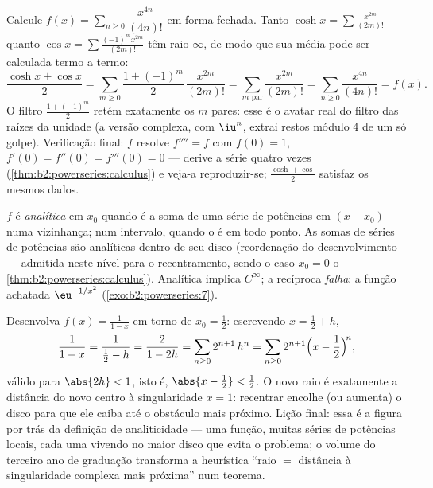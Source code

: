 \begin{example}\label{ex:b2:powerseries:quarter}
Calcule $f(x) = \sum_{n\geq0} \dfrac{x^{4n}}{(4n)!}$ em forma
fechada. Tanto $\cosh x = \sum \frac{x^{2m}}{(2m)!}$ quanto $\cos x =
\sum \frac{(-1)^m x^{2m}}{(2m)!}$ têm raio $\infty$, de modo que sua
média pode ser calculada termo a termo:
\[
\frac{\cosh x + \cos x}{2}
= \sum_{m\geq0}\frac{1 + (-1)^m}{2}\,\frac{x^{2m}}{(2m)!}
= \sum_{m \text{ par}}\frac{x^{2m}}{(2m)!}
= \sum_{n\geq0}\frac{x^{4n}}{(4n)!} = f(x) .
\]
O filtro $\frac{1+(-1)^m}{2}$ retém exatamente os $m$ pares: esse
é o avatar real do filtro das raízes da unidade (a versão
complexa, com $\iu^n$, extrai restos módulo $4$ de um só
golpe). Verificação final: $f$ resolve $f'''' = f$ com $f(0) = 1$,
$f'(0) = f''(0) = f'''(0) = 0$ --- derive a série quatro
vezes (\cref{thm:b2:powerseries:calculus}) e veja-a
reproduzir-se; $\frac{\cosh + \cos}{2}$ satisfaz os mesmos
dados.
\end{example}

\begin{definition}\label{def:b2:powerseries:analytic}
$f$ é \emph{analítica} em $x_0$ quando é
a soma de uma série de potências em $(x - x_0)$ numa vizinhança; num
intervalo, quando o é em todo ponto. As somas de séries de potências são analíticas
dentro de seu disco (reordenação do desenvolvimento --- admitida
neste nível para o recentramento, sendo o caso $x_0 = 0$ o
\cref{thm:b2:powerseries:calculus}). Analítica implica $C^\infty$;
a recíproca \emph{falha}: a função achatada $\eu^{-1/x^2}$
(\cref{exo:b2:powerseries:7}).
\end{definition}

\begin{example}\label{ex:b2:powerseries:recenter}
Desenvolva $f(x) = \frac{1}{1-x}$ em torno de $x_0 = \frac12$: escrevendo
$x = \frac12 + h$,
\[
\frac{1}{1 - x} = \frac{1}{\frac12 - h}
= \frac{2}{1 - 2h}
= \sum_{n\geq0} 2^{n+1}\,h^n
= \sum_{n\geq0} 2^{n+1}\Bigl(x - \frac12\Bigr)^{\!n},
\]
válido para $\abs{2h} < 1$, isto é, $\abs{x - \frac12} < \frac12$.
O novo raio é exatamente a distância do novo centro à
singularidade $x = 1$: recentrar encolhe (ou aumenta) o
disco para que ele caiba até o obstáculo mais próximo. Lição final: essa é
a figura por trás da definição de analiticidade --- uma
função, muitas séries de potências locais, cada uma vivendo no maior
disco que evita o problema; o volume do terceiro ano de graduação transforma a
heurística ``raio $=$ distância à singularidade complexa mais
próxima'' num teorema.
\end{example}

